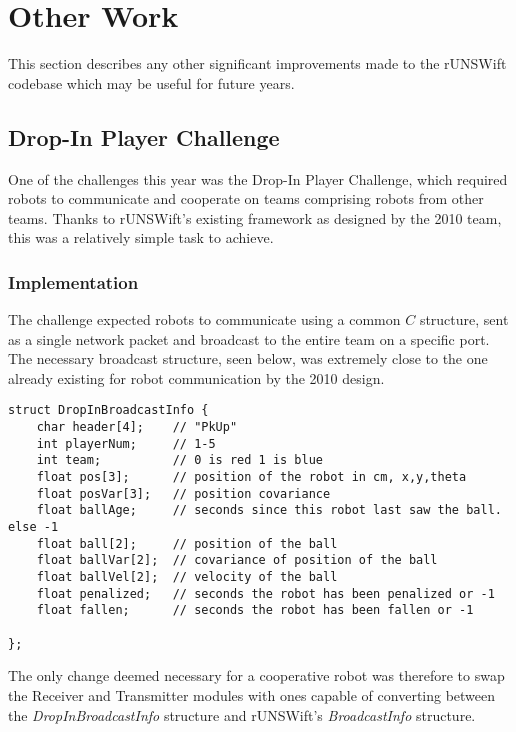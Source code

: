 \chapter{Other Work}
\label{chap:misc}

This section describes any other significant improvements made to the rUNSWift codebase which may be useful for future years.

\section{Drop-In Player Challenge}

One of the challenges this year was the Drop-In Player Challenge, which required robots to communicate and cooperate on teams comprising robots from other teams. Thanks to rUNSWift's existing framework as designed by the 2010 team\cite{runswift_2010}, this was a relatively simple task to achieve.

\subsection{Implementation}

The challenge expected robots to communicate using a common $C$ structure, sent as a single network packet and broadcast to the entire team on a specific port. The necessary broadcast structure, seen below, was extremely close to the one already existing for robot communication by the 2010 design. 

\begin{lstlisting}
struct DropInBroadcastInfo {
    char header[4];    // "PkUp"
    int playerNum;     // 1-5
    int team;          // 0 is red 1 is blue
    float pos[3];      // position of the robot in cm, x,y,theta
    float posVar[3];   // position covariance
    float ballAge;     // seconds since this robot last saw the ball. else -1
    float ball[2];     // position of the ball
    float ballVar[2];  // covariance of position of the ball
    float ballVel[2];  // velocity of the ball
    float penalized;   // seconds the robot has been penalized or -1
    float fallen;      // seconds the robot has been fallen or -1

};
\end{lstlisting}

The only change deemed necessary for a cooperative robot was therefore to swap the Receiver and Transmitter modules with ones capable of converting between the \textit{DropInBroadcastInfo } structure and rUNSWift's \textit{BroadcastInfo} structure.

